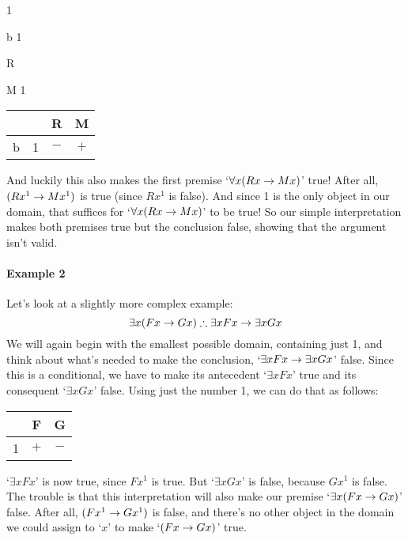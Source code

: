 \begin{center}
\begin{minipage}{0.7\textwidth}
\begin{multicols}{2}
\begin{ekey}
	\item[\text{Domain}] 1
	\item[b] 1
	\item[R]
	\item[M] 1
\end{ekey}
\columnbreak
\begin{tabular}{c|c|c|c|}
\hline
 & &   R  & M  \\ \hline
b& 1   &   $-$  & $+$  \\ \hline
\end{tabular}
\end{multicols}\end{minipage}\end{center}
And luckily this also makes the first premise `$\forall x(Rx \rightarrow Mx)$' true!  After all, $(Rx^1 \rightarrow Mx^1)$ is true (since $Rx^1$ is false).  And since 1 is the only object in our domain, that suffices for `$\forall x(Rx \rightarrow Mx)$'  to be true!  So our simple interpretation makes both premises true but the conclusion false, showing that the argument isn't valid.

\paragraph{Example 2} Let's look at a slightly more complex example:
$$\exists x(Fx \rightarrow Gx) \therefore \exists xFx \rightarrow \exists xGx$$
We will again begin with the smallest possible domain, containing just 1, and think about what's needed to make the conclusion, `$\exists xFx \rightarrow \exists xGx$' false.  Since this is a conditional, we have to make its antecedent `$\exists x Fx$' true and its consequent `$\exists xGx$' false.  Using just the number 1, we can do that as follows:
\begin{center}\begin{tabular}{|c|c|c|}
\hline
&   F  & G  \\ \hline
1   &   $+$  & $-$  \\ \hline
\end{tabular}\end{center}
`$\exists xFx$' is now true, since $Fx^1$ is true.  But `$\exists xGx$' is false, because $Gx^1$ is false. The trouble is that this interpretation will also make our premise `$\exists x(Fx \rightarrow Gx)$' false.  After all, $(Fx^1 \rightarrow Gx^1)$ is false, and there's no other object in the domain we could assign to `$x$' to make `$(Fx \rightarrow Gx)$' true.

